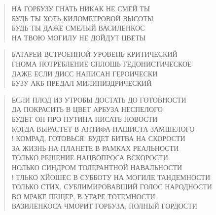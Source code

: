 \poemtitle{***}
\begin{verse}
НА ГОРБУЗУ ГНАТЬ НИКАК НЕ СМЕЙ ТЫ\\
БУДЬ ТЫ ХОТЬ КИЛОМЕТРОВОЙ ВЫСОТЫ\\
БУДЬ ТЫ ДАЖЕ СМЕЛЫЙ ВАСИЛЕНКОС\\
НА ТВОЮ МОГИЛУ НЕ ДОЙДУТ ЦВЕТЫ
\end{verse}

\poemtitle{***}
\begin{verse}
БАТАРЕИ ВСТРОЕННОЙ УРОВЕНЬ КРИТИЧЕСКИЙ\\
ГНОМА ПОТРЕБЛЕНИЕ СПЛОШЬ ГЕДОНИСТИЧЕСКОЕ\\
ДАЖЕ ЕСЛИ ДИСС НАПИСАН ГЕРОИЧЕСКИ\\
БУЗУ АКБ ПРЕДАЛ МИЛИПИЗДРИЧЕСКИЙ
\end{verse}

\poemtitle{***}
\begin{verse}
ЕСЛИ ПЛОД ИЗ УТРОБЫ ДОСТАТЬ ДО ГОТОВНОСТИ\\
ДА ПОКРАСИТЬ В ЦВЕТ АРБУЗА НЕСПЕЛОГО\\
БУДЕТ ОН ПРО ПУТИНА ПИСАТЬ НОВОСТИ\\
КОГДА ВЫРАСТЕТ В АНТИФА-НАШИСТА ЗАМШЕЛОГО\\!
КОМРАД, ГОТОВЬСЯ. БУДЕТ БИТВА НА СКОРОСТИ\\
ЗА ЖИЗНЬ НА ПЛАНЕТЕ В РАМКАХ РЕАЛЬНОСТИ\\
ТОЛЬКО РЕШЕНИЕ НАЦВОПРОСА ВСКОРОСТИ\\
НОЛЬКО СИНДРОМ ТОЛЕРАНТНОЙ НАВАЛЬНОСТИ\\!
ТЛЬКО ХЙОШЕС В СУББОТУ НА МОГИЛЕ ТАНДЕМНОСТИ\\
ТОЛЬКО СТИХ, СУБЛИМИРОВАВШИЙ ГОЛОС НАРОДНОСТИ\\
ВО МРАКЕ ПЕЩЕР, В УГАРЕ ТОТЕМНОСТИ\\
ВАЗИЛЕНКОСА ЧМОРИТ ГОРБУЗА, ПОЛНЫЙ ГОРДОСТИ
\end{verse}

